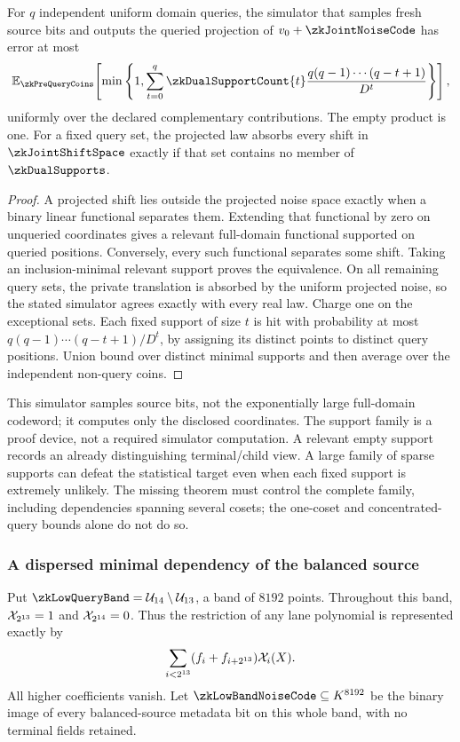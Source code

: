 \begin{lemma}\label{lem:zk-query-support-bound}
For $q$ independent uniform domain queries, the simulator that samples fresh source bits and outputs the queried projection of $v_0+\zkJointNoiseCode$ has error at most
\[
 \mathbb E_{\zkPreQueryCoins}\!\left[
  \min\left\{1,\sum_{t=0}^{q}\zkDualSupportCount{t}
       \frac{q(q-1)\cdots(q-t+1)}{D^t}\right\}
 \right],
\]
uniformly over the declared complementary contributions. The empty product is one. For a fixed query set, the projected law absorbs every shift in $\zkJointShiftSpace$ exactly if that set contains no member of $\zkDualSupports$.
\end{lemma}
\begin{proof}
A projected shift lies outside the projected noise space exactly when a binary linear functional separates them. Extending that functional by zero on unqueried coordinates gives a relevant full-domain functional supported on queried positions. Conversely, every such functional separates some shift. Taking an inclusion-minimal relevant support proves the equivalence. On all remaining query sets, the private translation is absorbed by the uniform projected noise, so the stated simulator agrees exactly with every real law. Charge one on the exceptional sets. Each fixed support of size $t$ is hit with probability at most $q(q-1)\cdots(q-t+1)/D^t$, by assigning its distinct points to distinct query positions. Union bound over distinct minimal supports and then average over the independent non-query coins.
\end{proof}

This simulator samples source bits, not the exponentially large full-domain codeword; it computes only the disclosed coordinates. The support family is a proof device, not a required simulator computation. A relevant empty support records an already distinguishing terminal/child view. A large family of sparse supports can defeat the statistical target even when each fixed support is extremely unlikely. The missing theorem must control the complete family, including dependencies spanning several cosets; the one-coset and concentrated-query bounds alone do not do so.

\subsubsection{A dispersed minimal dependency of the balanced source}

Put $\zkLowQueryBand=\subsp_{14}\setminus\subsp_{13}$, a band of $8192$ points. Throughout this band, $\mathcal{X}_{2^{13}}=1$ and $\mathcal{X}_{2^{14}}=0$. Thus the restriction of any lane polynomial is represented exactly by
\[
 \sum_{i<2^{13}}(f_i+f_{i+2^{13}})\mathcal{X}_i(X).
\]
All higher coefficients vanish. Let $\zkLowBandNoiseCode\subseteq\K^{8192}$ be the binary image of every balanced-source metadata bit on this whole band, with no terminal fields retained.

